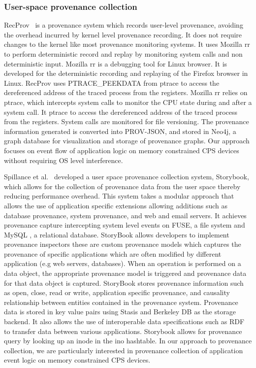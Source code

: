 \subsubsection{User-space provenance collection}
RecProv~\cite{rec_prov} is a provenance system which records user-level provenance, avoiding the overhead incurred by kernel level provenance recording. It does not require changes to the kernel like most provenance monitoring systems. It uses Mozilla rr to perform deterministic record and replay by monitoring system calls  and non deterministic input. Mozilla rr is a debugging tool for Linux browser. It is developed for the deterministic recording and replaying of the Firefox browser in Linux. RecProv uses PTRACE\_PEEKDATA from ptrace to access the dereferenced address of the traced process from the registers. Mozilla rr relies on ptrace, which intercepts system calls to monitor the CPU state during and after a system call. It ptrace to access the dereferenced address of the traced process from the registers. System calls are monitored for file versioning. The provenance information generated is converted into PROV-JSON, and stored in Neo4j, a graph database for visualization and storage of provenance graphs. Our approach
focuses on event flow of application logic on memory constrained CPS devices without requiring OS level interference.


Spillance et al.~\cite{story} developed a user space provenance collection system, Storybook, which allows for the collection of provenance data from the user space thereby reducing performance overhead. This system takes a modular approach that allows the use of application specific extensions allowing additions such as database provenance, system provenance, and web and email servers. It achieves provenance capture intercepting system level events on FUSE, a file system and MySQL , a relational database. StoryBook allows developers to implement provenance inspectors these are custom provenance models which captures the provenance of specific applications which are often modified by different application (e.g web servers, databases). When an operation is performed on a data object, the appropriate provenance model is triggered and provenance data for that data object is captured. StoryBook stores provenance information such as open, close, read or write, application specific provenance, and causality relationship between entities contained in the provenance system. Provenance data is stored in key value pairs using Stasis and Berkeley DB as the storage backend. It also allows the use of interoperable data specifications such as RDF to transfer data between various applications. Storybook allows for provenance query by looking up an inode in the ino hashtable. In our approach to provenance collection, we are particularly interested in provenance collection of application event logic on memory constrained CPS devices.

